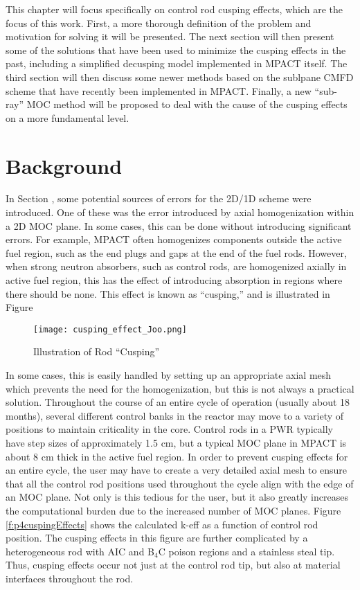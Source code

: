 This chapter will focus specifically on control rod cusping effects, which are the focus of this work.  First, a more thorough definition of the problem and motivation for solving it will be presented.  The next section will then present some of the solutions that have been used to minimize the cusping effects in the past, including a simplified decusping model implemented in MPACT itself.  The third section will then discuss some newer methods based on the sublpane CMFD scheme that have recently been implemented in MPACT.  Finally, a new ``sub-ray'' MOC method will be proposed to deal with the cause of the cusping effects on a more fundamental level.

\section{Background}

In Section , some potential sources of errors for the 2D/1D scheme were introduced.  One of these was the error introduced by axial homogenization within a 2D MOC plane.  In some cases, this can be done without introducing significant errors.  For example, MPACT often homogenizes components outside the active fuel region, such as the end plugs and gaps at the end of the fuel rods.  However, when strong neutron absorbers, such as control rods, are homogenized axially in active fuel region, this has the effect of introducing absorption in regions where there should be none.  This effect is known as ``cusping,'' and is illustrated in Figure 

\begin{figure}
    \centering
    \texttt{[image: cusping\_effect\_Joo.png]}
    \caption{Illustration of Rod ``Cusping''}\label{f:cuspingEffectJoo}
\end{figure}

In some cases, this is easily handled by setting up an appropriate axial mesh which prevents the need for the homogenization, but this is not always a practical solution.  Throughout the course of an entire cycle of operation (usually about 18 months), several different control banks in the reactor may move to a variety of positions to maintain criticality in the core.  Control rods in a PWR typically have step sizes of approximately 1.5 cm, but a typical MOC plane in MPACT is about 8 cm thick in the active fuel region.  In order to prevent cusping effects for an entire cycle, the user may have to create a very detailed axial mesh to ensure that all the control rod positions used throughout the cycle align with the edge of an MOC plane.  Not only is this tedious for the user, but it also greatly increases the computational burden due to the increased number of MOC planes.  Figure \ref{f:p4cuspingEffects} shows the calculated k-eff as a function of control rod position.  The cusping effects in this figure are further complicated by a heterogeneous rod with AIC and B$_4$C poison regions and a stainless steal tip.  Thus, cusping effects occur not just at the control rod tip, but also at material interfaces throughout the rod.

